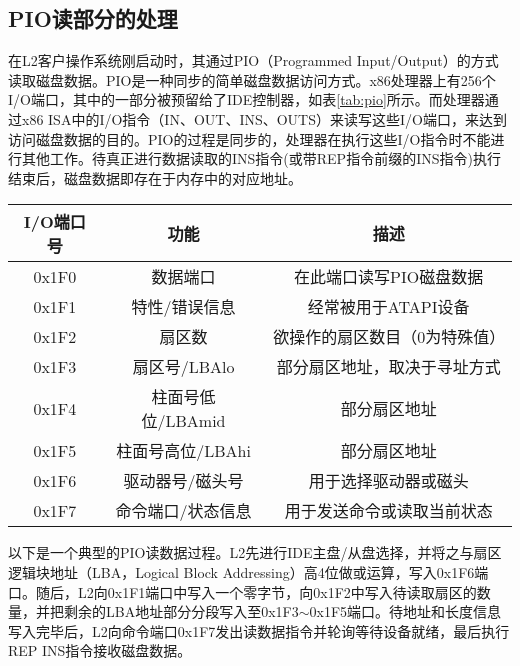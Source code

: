 \subsection{PIO读部分的处理}

在L2客户操作系统刚启动时，其通过PIO（Programmed Input/Output）的方式读取磁盘数据。PIO是一种同步的简单磁盘数据访问方式。x86处理器上有256个I/O端口，其中的一部分被预留给了IDE控制器，如表\ref{tab:pio}所示。而处理器通过x86 ISA中的I/O指令（IN、OUT、INS、OUTS）来读写这些I/O端口，来达到访问磁盘数据的目的。PIO的过程是同步的，处理器在执行这些I/O指令时不能进行其他工作。待真正进行数据读取的INS指令(或带REP指令前缀的INS指令)执行结束后，磁盘数据即存在于内存中的对应地址。

\begin{table}[!htbp]
\centering
\begin{tabular}{ccc}
\toprule
I/O端口号	& 功能 & 描述\\
\midrule
0x1F0	& 数据端口	& 在此端口读写PIO磁盘数据\\
0x1F1	& 特性/错误信息	& 经常被用于ATAPI设备\\
0x1F2	& 扇区数	& 欲操作的扇区数目（0为特殊值）\\
0x1F3	& 扇区号/LBAlo	& 部分扇区地址，取决于寻址方式\\
0x1F4	& 柱面号低位/LBAmid	& 部分扇区地址\\
0x1F5	& 柱面号高位/LBAhi	& 部分扇区地址\\
0x1F6	& 驱动器号/磁头号	& 用于选择驱动器或磁头\\
0x1F7	& 命令端口/状态信息	& 用于发送命令或读取当前状态\\
\bottomrule
\end{tabular}
\end{table}

以下是一个典型的PIO读数据过程。L2先进行IDE主盘/从盘选择，并将之与扇区逻辑块地址（LBA，Logical Block Addressing）高4位做或运算，写入0x1F6端口。随后，L2向0x1F1端口中写入一个零字节，向0x1F2中写入待读取扇区的数量，并把剩余的LBA地址部分分段写入至0x1F3$\sim$0x1F5端口。待地址和长度信息写入完毕后，L2向命令端口0x1F7发出读数据指令并轮询等待设备就绪，最后执行REP INS指令接收磁盘数据。

